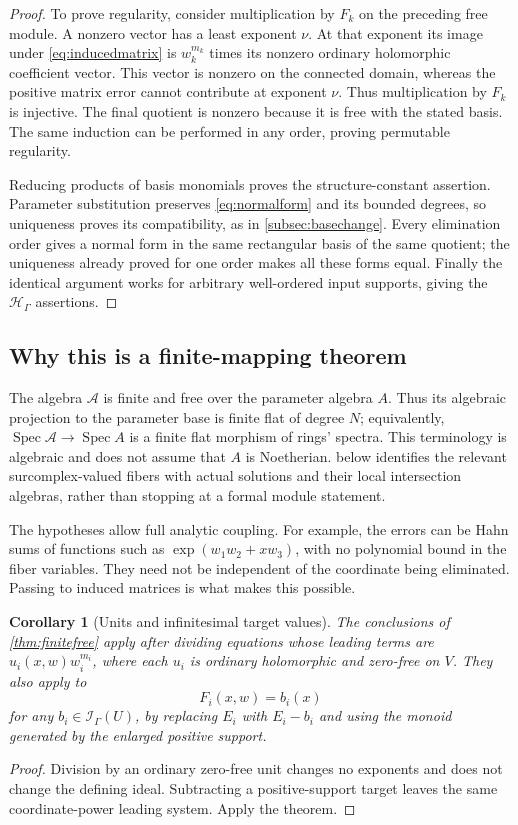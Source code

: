 \documentclass[11pt,oneside]{article}
\numberwithin{equation}{section}
\newtheorem{corollary}[theorem]{Corollary}
\theoremstyle{definition}
\theoremstyle{remark}\newtheorem{remark}[theorem]{Remark}
\newcommand{\HH}{\mathcal H_{\Gamma}}
\newcommand{\Ip}{\mathcal I_{\Gamma}}
\DeclareMathOperator{\Spec}{Spec}
\begin{document}
\begin{proof}
To prove regularity, consider multiplication by \(F_k\) on the preceding free module. A nonzero vector has a least exponent \(\nu\). At that exponent its image under \eqref{eq:inducedmatrix} is \(w_k^{m_k}\) times its nonzero ordinary holomorphic coefficient vector. This vector is nonzero on the connected domain, whereas the positive matrix error cannot contribute at exponent \(\nu\). Thus multiplication by \(F_k\) is injective. The final quotient is nonzero because it is free with the stated basis. The same induction can be performed in any order, proving permutable regularity.

Reducing products of basis monomials proves the structure-constant assertion. Parameter substitution preserves \eqref{eq:normalform} and its bounded degrees, so uniqueness proves its compatibility, as in \cref{subsec:basechange}. Every elimination order gives a normal form in the same rectangular basis of the same quotient; the uniqueness already proved for one order makes all these forms equal. Finally the identical argument works for arbitrary well-ordered input supports, giving the \(\HH\) assertions.
\end{proof}

\subsection{Why this is a finite-mapping theorem}
The algebra \(\mathcal A\) is finite and free over the parameter algebra \(A\). Thus its algebraic projection to the parameter base is finite flat of degree \(N\); equivalently, \(\Spec\mathcal A\to\Spec A\) is a finite flat morphism of rings' spectra. This terminology is algebraic and does not assume that \(A\) is Noetherian.  below identifies the relevant surcomplex-valued fibers with actual solutions and their local intersection algebras, rather than stopping at a formal module statement.

The hypotheses allow full analytic coupling. For example, the errors can be Hahn sums of functions such as \(\exp(w_1w_2+xw_3)\), with no polynomial bound in the fiber variables. They need not be independent of the coordinate being eliminated. Passing to induced matrices is what makes this possible.

\begin{corollary}[Units and infinitesimal target values]\label{cor:units-targets}
The conclusions of \cref{thm:finitefree} apply after dividing equations whose leading terms are \(u_i(x,w)w_i^{m_i}\), where each \(u_i\) is ordinary holomorphic and zero-free on \(V\). They also apply to
\[
 F_i(x,w)=b_i(x)
\]
for any \(b_i\in\Ip(U)\), by replacing \(E_i\) with \(E_i-b_i\) and using the monoid generated by the enlarged positive support.
\end{corollary}
\begin{proof}
Division by an ordinary zero-free unit changes no exponents and does not change the defining ideal. Subtracting a positive-support target leaves the same coordinate-power leading system. Apply the theorem.
\end{proof}
\end{document}
